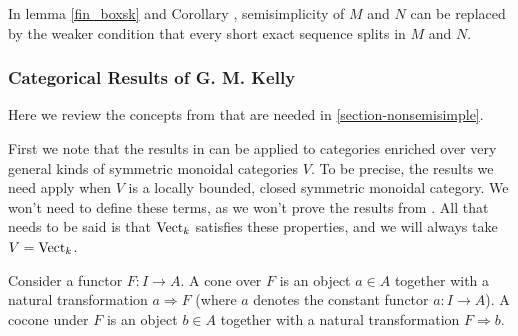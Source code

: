 \begin{remark}
  In lemma \ref{fin_boxsk} and Corollary \label{fin_kelly}, semisimplicity of
  $M$ and $N$ can be replaced by the weaker condition that every short exact
  sequence splits in $M$ and $N$.
\end{remark}


% 
% 
% 

\subsubsection{Categorical Results of G. M. Kelly} \label{review_kelly}

Here we review the concepts from \cite{kelly/basic-concepts-enriched} that are
needed in \ref{section-nonsemisimple}.

First we note that the results in \cite{kelly/basic-concepts-enriched} can be
applied to categories enriched over very general kinds of symmetric monoidal
categories $V$. To be precise, the results we need apply when $V$ is a locally
bounded, closed symmetric monoidal category. We won't need to define these
terms, as we won't prove the results from
\cite{kelly/basic-concepts-enriched}. All that needs to be said is that
$\operatorname{Vect}_k$ satisfies these properties, and we will always take $V=\operatorname{Vect}_k$.

\begin{definition}

  \noindent Consider a functor $F:I\to A$. A cone over $F$ is an object $a\in
  A$ together with a natural transformation $a\Rightarrow F$ (where $a$
  denotes the constant functor $a:I\to A$). A cocone under $F$ is an object
  $b\in A$ together with a natural transformation $F\Rightarrow b$.
\end{definition}

